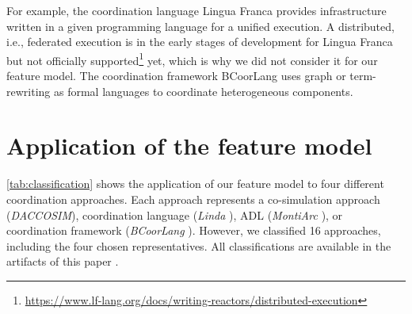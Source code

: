 \documentclass[runningheads]{llncs}
\begin{document}
For example, the coordination language Lingua Franca \cite{lohstrohReactorsDeterministicModel2020} provides infrastructure written in a given programming language for a unified execution.
A distributed, i.e., federated execution is in the early stages of development for Lingua Franca but not officially supported\footnote{\url{https://www.lf-lang.org/docs/writing-reactors/distributed-execution}} yet, which is why we did not consider it for our feature model.
The coordination framework BCoorLang \cite{krauterBehavioralConsistencyMultimodeling2023} uses graph or term-rewriting as formal languages to coordinate heterogeneous components.


\section{Application of the feature model} \label{sec:application}
\autoref{tab:classification} shows the application of our feature model to four different coordination approaches.
Each approach represents a co-simulation approach (\textit{DACCOSIM}), coordination language (\textit{Linda} \cite{carrieroLindaContext1989,carrieroLindaAlternativeMessagepassing1994}), ADL (\textit{MontiArc} \cite{haberMontiArcArchitecturalModeling2014}), or coordination framework (\textit{BCoorLang} \cite{krauterBehavioralConsistencyHeterogeneous2021,krauterBehavioralConsistencyMultimodeling2023}).
However, we classified 16 approaches, including the four chosen representatives.
All classifications are available in the artifacts of this paper \cite{timkrauterArtifactsCoordination2024}.
\end{document}
